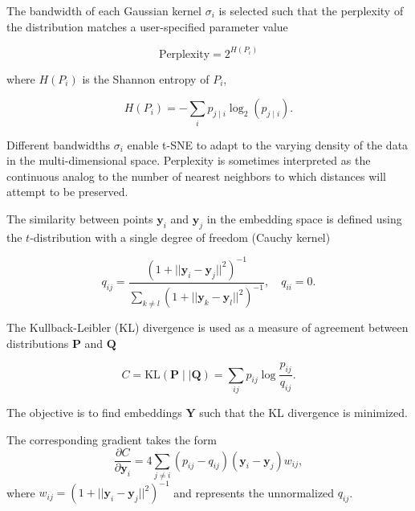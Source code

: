 \documentclass[letter]{article}
\begin{document}
The bandwidth of each Gaussian kernel $\sigma_i$ is selected such that the
perplexity of the distribution matches a user-specified parameter value

\begin{equation}
\text{Perplexity} = 2^{H(P_i)}
\end{equation}

\noindent where $H(P_i)$ is the Shannon entropy of $P_i$,

\begin{equation}
H(P_i) = -\sum_i p_{j \mid i} \log_2 (p_{j \mid i}).
\end{equation}

\noindent Different bandwidths $\sigma_i$ enable t-SNE to adapt to the varying
density of the data in the multi-dimensional space. Perplexity is sometimes
interpreted as the continuous analog to the number of nearest neighbors to which
distances will attempt to be preserved. 

The similarity between points $\mathbf{y}_i$ and $\mathbf{y}_j$ in the
embedding space is defined using the $t$-distribution with a single degree of
freedom (Cauchy kernel)

\begin{equation}
q_{ij} = \frac{\left ( 1 + || \mathbf{y}_i - \mathbf{y}_j ||^2 \right )^{-1}}
{\sum_{k \neq l}\left ( 1 + || \mathbf{y}_k - \mathbf{y}_l ||^2 \right )^{-1}},
\quad q_{ii} = 0.
\label{eq:cauchy_kernel}
\end{equation}

The Kullback-Leibler (KL) divergence is used as a measure of agreement
between distributions $\mathbf{P}$ and $\mathbf{Q}$

\begin{equation}
C = \text{KL}(\mathbf{P} \mid \mid \mathbf{Q}) = \sum_{ij} p_{ij} \log \frac{p_{ij}}{q_{ij}}.
\label{eq:kl_divergence}
\end{equation}

\noindent The objective is to find embeddings $\mathbf{Y}$ such that the
KL divergence is minimized.

The corresponding gradient takes the form
\begin{equation}
\frac{\partial C}{\partial \mathbf{y}_i} = 4 \sum_{j \neq i} \left ( p_{ij} - q_{ij} \right ) \left ( \mathbf{y}_i - \mathbf{y}_j \right ) w_{ij},
\label{eq:tsne_gradient}
\end{equation}
where $w_{ij} = \left ( 1 + || \mathbf{y}_i - \mathbf{y}_j || ^2 \right )^{-1}$
and represents the unnormalized $q_{ij}$.
\end{document}
